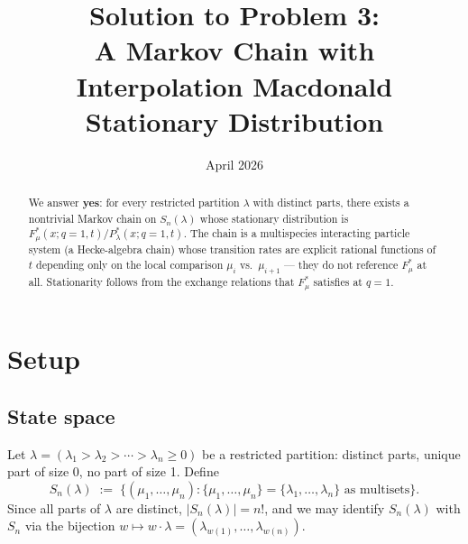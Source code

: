 \documentclass[12pt]{article}
\title{Solution to Problem 3:\\
A Markov Chain with Interpolation Macdonald Stationary Distribution}
\author{}
\date{April 2026}
\theoremstyle{definition}
\theoremstyle{remark}
\begin{document}
\maketitle

\begin{abstract}
We answer \textbf{yes}: for every restricted partition $\lambda$ with distinct
parts, there exists a nontrivial Markov chain on $S_n(\lambda)$ whose stationary
distribution is $F^*_\mu(x;q=1,t)/P^*_\lambda(x;q=1,t)$.  The chain is a
multispecies interacting particle system (a Hecke-algebra chain) whose
transition rates are explicit rational functions of $t$ depending only on the
local comparison $\mu_i$ vs.\ $\mu_{i+1}$ --- they do not reference
$F^*_\mu$ at all.  Stationarity follows from the exchange relations that
$F^*_\mu$ satisfies at $q=1$.
\end{abstract}

\section{Setup}

\subsection{State space}
Let $\lambda = (\lambda_1 > \lambda_2 > \cdots > \lambda_n \geq 0)$ be a
restricted partition: distinct parts, unique part of size 0, no part of size 1.
Define
\[
  S_n(\lambda)
  \;:=\;
  \bigl\{(\mu_1,\dots,\mu_n) : \{\mu_1,\dots,\mu_n\} = \{\lambda_1,\dots,\lambda_n\}
  \text{ as multisets}\bigr\}.
\]
Since all parts of $\lambda$ are distinct, $|S_n(\lambda)| = n!$, and we may
identify $S_n(\lambda)$ with $S_n$ via the bijection $w \mapsto w\cdot\lambda
= (\lambda_{w(1)},\dots,\lambda_{w(n)})$.
\end{document}

